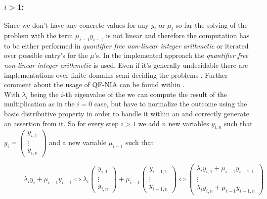 \subsubsection{$i > 1$:}
Since we don't have any concrete values for any $y_i$ or $\mu_i$ so far the solving of the problem with the term $\mu_{i-1}y_{i-1}$ is not linear and therefore the computation has to be either performed in \textit{quantifier free non-linear integer arithmetic} or iterated over possible entry's for the $\mu$'s.\newline
In the implemented approach the \textit{quantifier free non-linear integer arithmetic} is used. Even if it's generally undecidable there are implementations over finite domains semi-deciding the problems  \cite{behrmann2014bit} \cite{giesl2016}. \newline
Further comment about the usage of QF-NIA can be found within .
\\
With $\lambda_i$ being the $i$-th eigenvalue of the \updatematrix we can compute the result of the multiplication as in the $i=0$ case, but have to normalize the outcome using the basic distributive property in order to handle it within an \rpntree and correctly generate an assertion from it.\newline
So for every step $i > 1$ we add $n$ new variables $y_{i,n}$ such that $y_i = \begin{pmatrix} y_{i,1} \\ \vdots \\ y_{i,n}\end{pmatrix}$ and a new variable $\mu_{i-1}$ such that 
\begin{figure}[H]
	\centering
	$\lambda_i y_i+\mu_{i-1}y_{i-1} \Leftrightarrow \lambda_i \begin{pmatrix} y_{i,1} \\ \vdots \\ y_{i,n}\end{pmatrix} + \mu_{i-1} \begin{pmatrix} y_{i-1,1} \\ \vdots \\ y_{i-1,n}\end{pmatrix} \Leftrightarrow \begin{pmatrix}
		\lambda_i y_{i,1}+\mu_{i-1}y_{i-1,1} \\ \vdots \\ \lambda_i y_{i,n}+\mu_{i-1}y_{i-1,n}
	\end{pmatrix}$ 
\end{figure}

